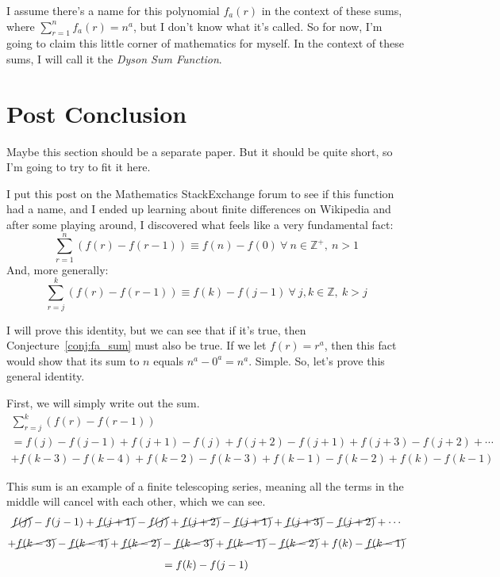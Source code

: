\documentclass[a4paper]{article}
\newcommand{\sn}{\sum\limits_{r=1}^{n}}
\newcommand{\zp}{\mathbb{Z}^+}
\begin{document}
I assume there's a name for this polynomial $f_a(r)$ in the context of these sums, where $\sn f_a(r) = n^a$, but I don't know what it's called. So for now, I'm going to claim this little corner of mathematics for myself. In the context of these sums, I will call it the \textit{Dyson Sum Function}.

\section{Post Conclusion}

Maybe this section should be a separate paper. But it should be quite short, so I'm going to try to fit it here.

I put this post\cite{math-stackex-post} on the Mathematics StackExchange forum to see if this function had a name, and I ended up learning about finite differences\cite{wikipedia-finite-difference} on Wikipedia and after some playing around, I discovered what feels like a very fundamental fact: $$\sn (f(r) - f(r-1)) \equiv f(n) - f(0)\ \forall\ n \in \zp,\ n > 1$$ And, more generally: $$\sum\limits_{r=j}^{k} (f(r) - f(r-1)) \equiv f(k) - f(j - 1)\ \forall\ j, k \in \mathbb{Z},\ k > j$$

I will prove this identity, but we can see that if it's true, then Conjecture~\ref{conj:fa_sum} must also be true. If we let $f(r) = r^a$, then this fact would show that its sum to $n$ equals $n^a - 0^a = n^a$. Simple. So, let's prove this general identity.

First, we will simply write out the sum.
\begin{gather*}
\sum\limits_{r=j}^{k} (f(r) - f(r-1))\\[0.5em]
= f(j) - f(j-1) + f(j+1) - f(j) + f(j+2) - f(j+1) + f(j+3) - f(j+2) + \cdots\\[0.5em]
+ f(k-3) - f(k-4) + f(k-2) - f(k-3) + f(k-1) - f(k-2) + f(k) - f(k-1)
\end{gather*}

This sum is an example of a finite telescoping series\cite{wikipedia-telescoping-series}, meaning all the terms in the middle will cancel with each other, which we can see.
\begin{gather*}
\cancel{f(j)} - f(j-1) + \cancel{f(j+1)} - \cancel{f(j)} + \cancel{f(j+2)} - \cancel{f(j+1)} + \cancel{f(j+3)} - \cancel{f(j+2)} + \cdots\\[0.5em]
+ \cancel{f(k-3)} - \cancel{f(k-4)} + \cancel{f(k-2)} - \cancel{f(k-3)} + \cancel{f(k-1)} - \cancel{f(k-2)} + f(k) - \cancel{f(k-1)}\\[0.5em]
= f(k) - f(j-1)
\end{gather*}
\end{document}
